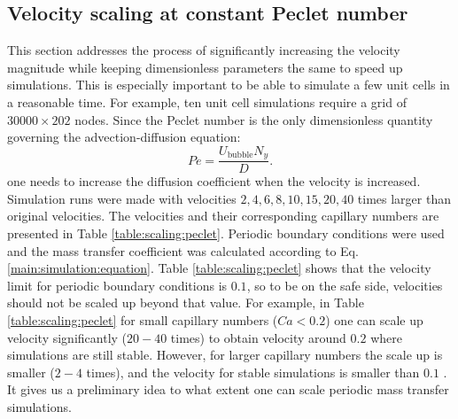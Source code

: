 \documentclass{article}
\newcommand{\beq}{\begin{equation}}
\newcommand{\feq}{\end{equation}}
\newcommand{\ububble}{U_{\mathrm{bubble}}}
\newcommand{\omegaminus}{\omega_{-}}
\begin{document}
\subsection{Velocity scaling at constant Peclet number}
\label{section:keeping:peclet}
This section addresses the process of significantly increasing the
velocity magnitude while keeping dimensionless parameters the same to
speed up                                      
simulations. This is especially important to be able to simulate a few unit cells in a reasonable time.
For example, ten unit cell simulations require a grid of $30000\times202$ nodes.
Since the Peclet number is the only dimensionless quantity governing
the advection-diffusion equation:
\beq
Pe=\frac{\ububble N_y}{D}.
\feq
one needs to increase the diffusion coefficient when the velocity is increased. Simulation runs were made with
velocities $2,4,6,8,10,15,20,40$ times larger than original velocities. The velocities and
their corresponding capillary numbers are presented in Table \ref{table:scaling:peclet}. Periodic
boundary conditions were used and the mass transfer coefficient was calculated according to Eq.
\ref{main:simulation:equation}. Table \ref{table:scaling:peclet} shows that the velocity limit
for  periodic boundary conditions is $0.1$, so to be on the safe side, velocities should not be scaled
up beyond that value.  For example, in Table \ref{table:scaling:peclet} for small capillary numbers ($Ca<0.2$)  one can scale up velocity significantly ($20-40$ times) to obtain velocity around $0.2$ where simulations are still stable. However, for larger capillary numbers the scale up is smaller ($2-4$ times), and the velocity for stable simulations is smaller than $0.1$ .   %
It gives us a
preliminary idea to what extent one can scale periodic mass transfer simulations. 
\end{document}
